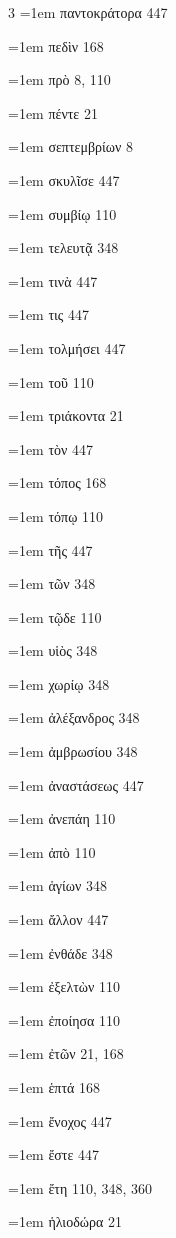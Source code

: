 \begin{multicols}{3}
\hangindent=1em παντοκράτορα 447\par
\hangindent=1em πεδὶν 168\par
\hangindent=1em πρὸ 8, 110\par
\hangindent=1em πέντε 21\par
\hangindent=1em σεπτεμβρίων 8\par
\hangindent=1em σκυλῖσε 447\par
\hangindent=1em συμβίῳ 110\par
\hangindent=1em τελευτᾷ 348\par
\hangindent=1em τινὰ 447\par
\hangindent=1em τις 447\par
\hangindent=1em τολμήσει 447\par
\hangindent=1em τοῦ 110\par
\hangindent=1em τριάκοντα 21\par
\hangindent=1em τὸν 447\par
\hangindent=1em τόπος 168\par
\hangindent=1em τόπῳ 110\par
\hangindent=1em τῆς 447\par
\hangindent=1em τῶν 348\par
\hangindent=1em τῷδε 110\par
\hangindent=1em υἱὸς 348\par
\hangindent=1em χωρίῳ 348\par
\hangindent=1em ἀλέξανδρος 348\par
\hangindent=1em ἀμβρωσίου 348\par
\hangindent=1em ἀναστάσεως 447\par
\hangindent=1em ἀνεπάη 110\par
\hangindent=1em ἀπὸ 110\par
\hangindent=1em ἁγίων 348\par
\hangindent=1em ἄλλον 447\par
\hangindent=1em ἐνθάδε 348\par
\hangindent=1em ἐξελτὼν 110\par
\hangindent=1em ἐποίησα 110\par
\hangindent=1em ἐτῶν 21, 168\par
\hangindent=1em ἑπτά 168\par
\hangindent=1em ἔνοχος 447\par
\hangindent=1em ἔστε 447\par
\hangindent=1em ἔτη 110, 348, 360\par
\hangindent=1em ἡλιοδώρα 21\par

\end{multicols}
